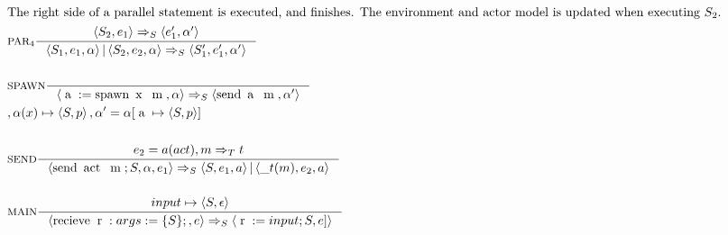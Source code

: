 \begin{align*}
\intertext{The right side of a parallel statement is executed, and finishes. The environment and actor model is updated when executing $S_2$.}
&\inference[$\text{PAR}_4$]{\Braket{S_2,e_1} \Rightarrow_S \Braket{e_1',\alpha'}}
                           {\Braket{S_1,e_1,\alpha}|\Braket{S_2,e_2,\alpha} \Rightarrow_S \Braket{S_1',e_1',\alpha'}}
\\\\
&\inference[$\text{SPAWN}$]{}
                       {\Braket{\Ta := \Tspawn \Tx \Tm,\alpha} \Rightarrow_S \Braket{\Tsend \Ta \Tm,\alpha'}}
\\
&												{, \alpha(x) \mapsto \Braket{S,p} , \alpha' = \alpha[\Ta \mapsto \Braket{S, p}]}
\\\\
&\inference[$\text{SEND}$]{e_2 = a(act),m \Rightarrow_T t}
                       {\Braket{\Tsend \Tact \Tm ; S,\alpha,e_1} \Rightarrow_S \Braket{S,e_1,a}|\Braket{\_t(m),e_2,a}}
\\\\
&\inference[$\text{MAIN}$]{input \mapsto \Braket{S,\epsilon}}
                          {\Braket{\Trecieve \Tr:args := \{S\};,e} \Rightarrow_S \Braket{\Tr := input;S, e]}}
\end{align*}